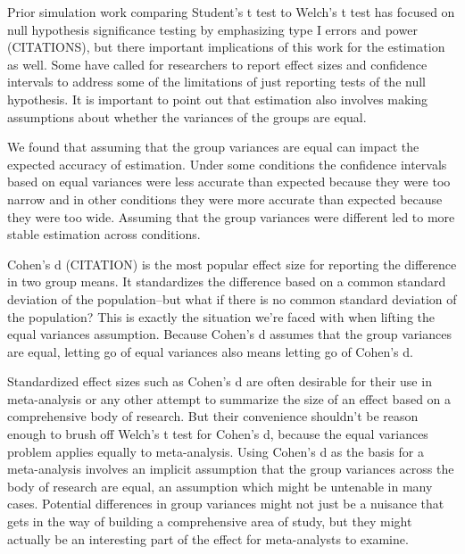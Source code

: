 \documentclass[man,a4paper,noextraspace,apacite]{apa6}\usepackage[]{graphicx}\usepackage[]{color}
\begin{document}
    Prior simulation work comparing Student's t test to Welch's t test has focused on null hypothesis significance testing by emphasizing type I errors and power (CITATIONS), but there important implications of this work for the estimation as well. Some have called for researchers to report effect sizes and confidence intervals to address some of the limitations of just reporting tests of the null hypothesis. It is important to point out that estimation also involves making assumptions about whether the variances of the groups are equal.
    
    We found that assuming that the group variances are equal can impact the expected accuracy of estimation. Under some conditions the confidence intervals based on equal variances were less accurate than expected because they were too narrow and in other conditions they were more accurate than expected because they were too wide. Assuming that the group variances were different led to more stable estimation across conditions.
    
    Cohen's d (CITATION) is the most popular effect size for reporting the difference in two group means. It standardizes the difference based on a common standard deviation of the population--but what if there is no common standard deviation of the population? This is exactly the situation we're faced with when lifting the equal variances assumption. Because Cohen's d assumes that the group variances are equal, letting go of equal variances also means letting go of Cohen's d. 
    
    Standardized effect sizes such as Cohen's d are often desirable for their use in meta-analysis or any other attempt to summarize the size of an effect based on a comprehensive body of research. But their convenience shouldn't be reason enough to brush off Welch's t test for Cohen's d, because the equal variances problem applies equally to meta-analysis. Using Cohen's d as the basis for a meta-analysis involves an implicit assumption that the group variances across the body of research are equal, an assumption which might be untenable in many cases. Potential differences in group variances might not just be a nuisance that gets in the way of building a comprehensive area of study, but they might actually be an interesting part of the effect for meta-analysts to examine. 
    
\end{document}
